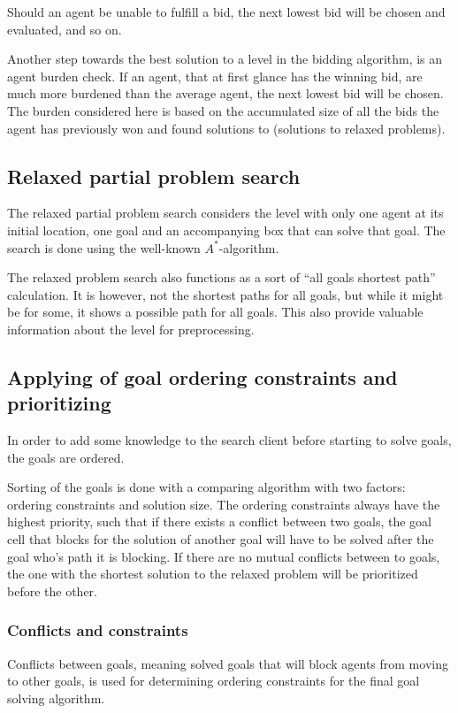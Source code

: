 \documentclass[Main]{subfiles}
\begin{document}
Should an agent be unable to fulfill a bid, the next lowest bid will be chosen
and evaluated, and so on. 


Another step towards the best solution to a level in the bidding algorithm, is
an agent burden check. If an agent, that at first glance has the winning bid,
are much more burdened than the average agent, the next lowest bid will be
chosen. The burden considered here is based on the accumulated size of all the
bids the agent has previously won and found solutions to (solutions to relaxed
problems). 

\subsection{Relaxed partial problem search}
The relaxed partial problem search considers the level with only one agent at
its initial location, one goal and an accompanying box that can solve that goal.
The search is done using the well-known $A^*$-algorithm.

The relaxed problem search also functions as a sort of ``all goals shortest
path'' calculation. It is however, not the shortest paths for all goals, but
while it might be for some, it shows a possible path for all goals. This also
provide valuable information about the level for preprocessing.


\subsection{Applying of goal ordering constraints and prioritizing}
\label{sec:goal_ordering}
In order to add some knowledge to the search client before starting to solve
goals, the goals are ordered. 


Sorting of the goals is done with a comparing algorithm with two factors:
ordering constraints and solution size. The ordering constraints always have the
highest priority, such that if there exists a conflict between two goals, the
goal cell that blocks for the solution of another goal will have to be solved
after the goal who's path it is blocking. If there are no mutual conflicts
between to goals, the one with the shortest solution to the relaxed problem will
be prioritized before the other. 

\subsubsection{Conflicts and constraints}
Conflicts between goals, meaning solved goals that will block agents from moving
to other goals, is used for determining ordering constraints for the final goal
solving algorithm. 
\end{document}
